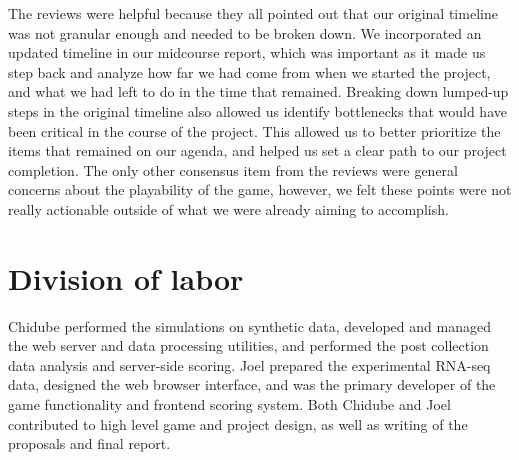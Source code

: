 \documentclass[12pt]{article}
\begin{document}
The reviews were helpful because they all pointed out that our original timeline was not granular enough and needed to be broken down. We incorporated an updated timeline in our midcourse
report, which was important as it made us step back and analyze how far we had come from when we started the project, and what we had left to do in the time that remained. Breaking down lumped-up steps in the original timeline also allowed us identify bottlenecks that would have been critical in the course of the project. This
allowed us to better prioritize the items that remained on our agenda, and helped us set a clear path to our project completion. The only other consensus item from the reviews were general
concerns about the playability of the game, however, we felt these points were not really actionable outside of what we were already aiming to accomplish.

\section*{Division of labor}

Chidube performed the simulations on synthetic data, developed and managed the web server and data processing utilities, and performed the post collection data analysis and server-side scoring. Joel prepared the experimental RNA-seq data, designed the web browser interface, and was the primary developer of the game functionality and frontend scoring system. Both Chidube and Joel contributed to high level game and project design, as well as writing of the proposals and final report.


\end{document}
